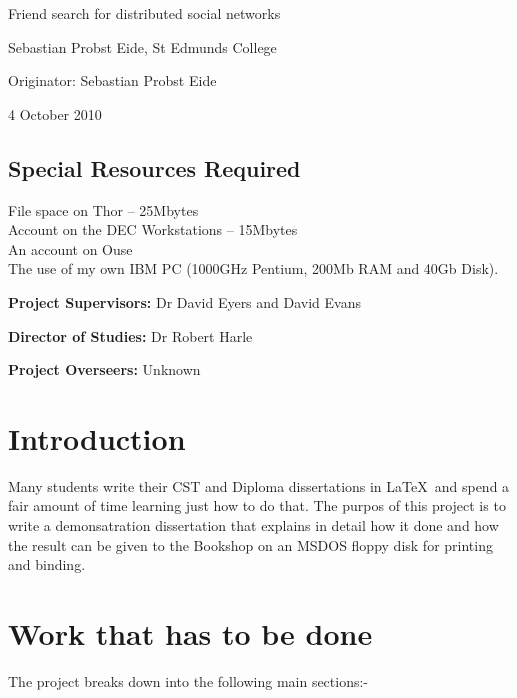 

\vfil

\centerline{\Large Friend search for distributed social networks }
\vspace{0.4in}
\centerline{\large Sebastian Probst Eide, St Edmunds College }
\vspace{0.3in}
\centerline{\large Originator: Sebastian Probst Eide}
\vspace{0.3in}
\centerline{\large 4 October 2010}

\vfil

\subsection*{Special Resources Required}
File space on Thor -- 25Mbytes\\
Account on the DEC Workstations -- 15Mbytes\\
An account on Ouse\\
The use of my own IBM PC (1000GHz Pentium, 200Mb RAM and 40Gb Disk).
\vspace{0.2in}

\noindent
{\bf Project Supervisors:} Dr David Eyers and David Evans
\vspace{0.2in}

\noindent
{\bf Director of Studies:} Dr Robert Harle
\vspace{0.2in}
\noindent
 
\noindent
{\bf Project Overseers:} Unknown 

\vfil
\pagebreak


\section*{Introduction}

Many students write their CST and Diploma dissertations in \LaTeX\ and
spend a fair amount of time learning just how to do that. The purpos of 
this project is to write a demonsatration dissertation that explains in
detail how it done and how the result can be given to the Bookshop
on an MSDOS floppy disk for printing and binding.

\section*{Work that has to be done}

The project breaks down into the following main sections:-

